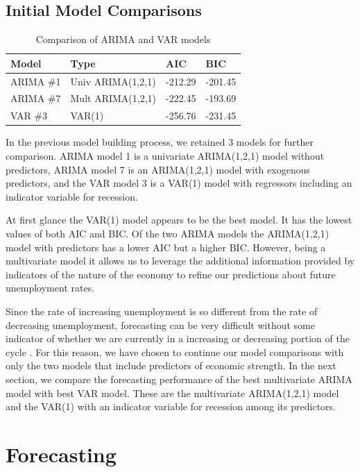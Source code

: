 \documentclass[twoside,twocolumn]{article}
\begin{document}
\subsection{Initial Model Comparisons}

\begin{table}[H]
\centering
\caption{Comparison of ARIMA and VAR models}
\begin{tabular}{llll}
  \hline
Model & Type & AIC & BIC \\
  \hline
ARIMA \#1 &Univ ARIMA(1,2,1) &   -212.29 & -201.45  \\
ARIMA \#7 & Mult ARIMA(1,2,1)  & -222.45 & -193.69   \\
VAR \#3 & VAR(1) & -256.76 & -231.45 \\
   \hline
\end{tabular}
\end{table}


In the previous model building process, we retained 3 models for further comparison. ARIMA model 1 is a univariate ARIMA(1,2,1) model without predictors, ARIMA model 7 is an ARIMA(1,2,1) model with exogenous predictors, and the VAR model 3 is a VAR(1) model with regressors including an indicator variable for recession.

At first glance the VAR(1) model appears to be the best model.  It has the lowest values of both AIC and BIC.  Of the two ARIMA models the ARIMA(1,2,1) model with predictors has a lower AIC but a higher BIC. However, being a multivariate model it allows us to leverage the additional information provided by indicators of the nature of the economy to refine our predictions about future unemployment rates.

Since the rate of increasing unemployment is so different from the rate of decreasing unemployment, forecasting can be very difficult without some indicator of whether we are currently in a increasing or decreasing portion of the cycle \citep{Montgomery1998}. For this reason, we have chosen to continue our model comparisons with only the two models that include predictors of economic strength. In the next section, we compare the forecasting performance of the best multivariate ARIMA model with best VAR model. These are the multivariate ARIMA(1,2,1) model and the VAR(1) with an indicator variable for recession among its predictors.


\section{Forecasting}
\end{document}
